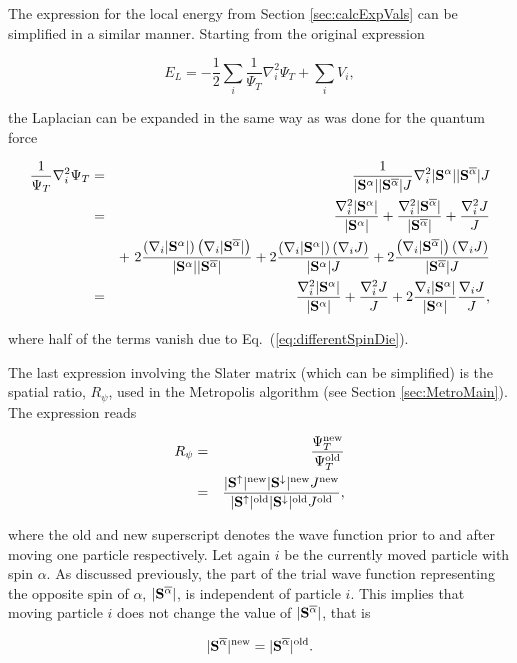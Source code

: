 The expression for the local energy from Section \ref{sec:calcExpVals} can be simplified in a similar manner. Starting from the original expression

\begin{equation}
 E_L = -\frac{1}{2}\sum_i \frac{1}{\Psi_T}\nabla^2_i \Psi_T + \sum_iV_i, \label{eq:localEsum}
\end{equation}

the Laplacian can be expanded in the same way as was done for the quantum force

 \begin{eqnarray}
  \frac{1}{\Psi_T}\nabla^2_i\Psi_T &=&  \frac{1}{|\mathbf{S}^{\alpha}||\mathbf{S}^{\overline{\alpha}}| J}\nabla^2_i |\mathbf{S}^{\alpha}||\mathbf{S}^{\overline{\alpha}}| J \nonumber\\
  &=& \frac{\nabla^2_i |\mathbf{S}^{\alpha}|}{|\mathbf{S}^{\alpha}|} + \frac{\nabla^2_i |\mathbf{S}^{\overline{\alpha}}|}{|\mathbf{S}^{\overline{\alpha}}|} + \frac{\nabla^2_i J}{J} \nonumber\\
  && +\,\, 2\frac{\left(\nabla_i|\mathbf{S}^{\alpha}|\right)\left(\nabla_i|\mathbf{S}^{\overline{\alpha}}|\right)}{|\mathbf{S}^{\alpha}||\mathbf{S}^{\overline{\alpha}}|} + 2 \frac{\left(\nabla_i|\mathbf{S}^{\alpha}|\right)\left(\nabla_i J\right)}{|\mathbf{S}^{\alpha}| J} + 2 \frac{\left(\nabla_i|\mathbf{S}^{\overline{\alpha}}|\right)\left(\nabla_i J\right)}{|\mathbf{S}^{\overline{\alpha}}| J} \nonumber\\
  &=& \frac{\nabla^2_i |\mathbf{S}^{\alpha}|}{|\mathbf{S}^{\alpha}|} + \frac{\nabla^2_i J}{J} + 2\frac{\nabla_i|\mathbf{S}^{\alpha}|}{|\mathbf{S}^{\alpha}|} \frac{\nabla_i J}{J},
\end{eqnarray}

where half of the terms vanish due to Eq.~(\ref{eq:differentSpinDie}).

The last expression involving the Slater matrix (which can be simplified) is the spatial ratio, $R_\psi$, used in the Metropolis algorithm (see Section \ref{sec:MetroMain}). The expression reads

\begin{eqnarray}
 R_\psi &=& \frac{\Psi_T^\mathrm{new}}{\Psi_T^\mathrm{old}} \nonumber\\
 &=& \frac{|\mathbf{S}^\uparrow|^\mathrm{new} |\mathbf{S}^\downarrow|^\mathrm{new} J^\mathrm{new}}{|\mathbf{S}^\uparrow|^\mathrm{old} |\mathbf{S}^\downarrow|^\mathrm{old} J^\mathrm{old}}, \label{eq:R_psi_allspins}\\
\end{eqnarray}

where the old and new superscript denotes the wave function prior to and after moving one particle respectively. Let again $i$ be the currently moved particle with spin $\alpha$. As discussed previously, the part of the trial wave function representing the opposite spin of $\alpha$, $|\mathbf{S}^{\overline{\alpha}}|$, is independent of particle $i$. This implies that moving particle $i$ does not change the value of $|\mathbf{S}^{\overline{\alpha}}|$, that is

\begin{equation}
 |\mathbf{S}^{\overline{\alpha}}|^\mathrm{new} = |\mathbf{S}^{\overline{\alpha}}|^\mathrm{old}.
\end{equation}

